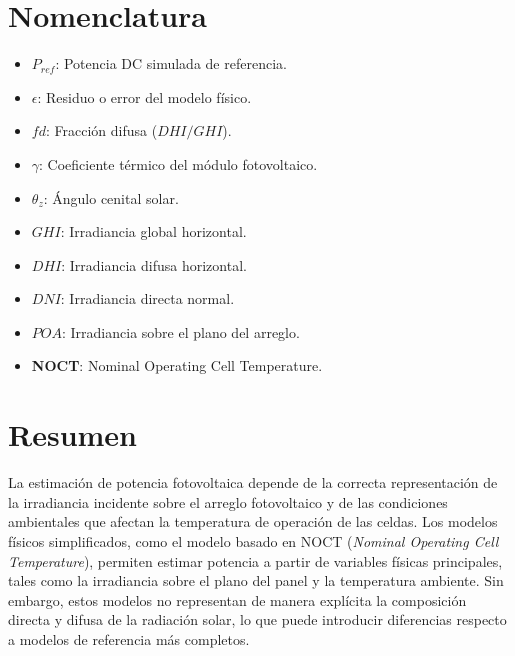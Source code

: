 \documentclass[12pt, letterpaper]{article}
\begin{document}
\hypersetup{pageanchor=true}
\pagestyle{informe}


\tableofcontents
\newpage
\listoffigures
\newpage
\listoftables
\newpage
\section*{Nomenclatura}
\begin{itemize}[label={}]
    \item \textbf{$P_{ref}$}: Potencia DC simulada de referencia.
    \item \textbf{$\epsilon$}: Residuo o error del modelo f\'isico.
    \item \textbf{$fd$}: Fracci\'on difusa ($DHI / GHI$).
    \item \textbf{$\gamma$}: Coeficiente t\'ermico del m\'odulo fotovoltaico.
    \item \textbf{$\theta_z$}: \'Angulo cenital solar.
    \item \textbf{$GHI$}: Irradiancia global horizontal.
    \item \textbf{$DHI$}: Irradiancia difusa horizontal.
    \item \textbf{$DNI$}: Irradiancia directa normal.
    \item \textbf{$POA$}: Irradiancia sobre el plano del arreglo.
    \item \textbf{NOCT}: Nominal Operating Cell Temperature.
\end{itemize}
\newpage


\section*{Resumen}

La estimaci\'on de potencia fotovoltaica depende de la correcta representaci\'on de la irradiancia incidente sobre el arreglo fotovoltaico y de las condiciones ambientales que afectan la temperatura de operaci\'on de las celdas. Los modelos f\'isicos simplificados, como el modelo basado en NOCT (\textit{Nominal Operating Cell Temperature}), permiten estimar potencia a partir de variables f\'isicas principales, tales como la irradiancia sobre el plano del panel y la temperatura ambiente. Sin embargo, estos modelos no representan de manera expl\'icita la composici\'on directa y difusa de la radiaci\'on solar, lo que puede introducir diferencias respecto a modelos de referencia m\'as completos.
\end{document}
